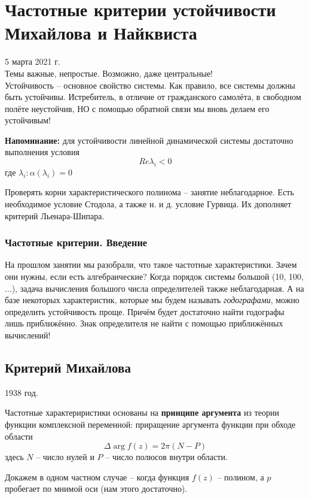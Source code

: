 \documentclass[main.tex]{subfiles}
\begin{document}
\section{ Частотные критерии устойчивости Михайлова и Найквиста }
5 марта 2021 г. \\

Темы важные, непростые.
Возможно, даже центральные! \\

Устойчивость -- основное свойство системы.
Как правило, все системы должны быть устойчивы.
Истребитель, в отличие от гражданского самолёта, в свободном полёте неустойчив, НО с помощью обратной связи мы вновь делаем его устойчивым!

\textbf{Напоминание:} для устойчивости линейной динамической системы достаточно выполнения условия
$$ \boxed{Re \lambda_i < 0} $$
где $ \lambda_i : \alpha(\lambda_i) = 0 $

Проверять корни характеристического полинома -- занятие неблагодарное.
Есть необходимое условие Стодола, а также н. и д. условие Гурвица.
Их дополняет критерий Льенара-Шипара.

\subsubsection{Частотные критерии. Введение}

На прошлом занятии мы разобрали, что такое частотные характеристики.
Зачем они нужны, если есть алгебраические?
Когда порядок системы большой (10, 100, ...), задача вычисления большого числа определителей также неблагодарная.
А на базе некоторых характеристик, которые мы будем называть \emph{годографами}, можно определить устойчивость проще.
Причём будет достаточно найти годографы лишь приближённо.
Знак определителя не найти с помощью приближённых вычислений!

\subsection{Критерий Михайлова}
1938 год.

Частотные характериристики основаны на \textbf{принципе аргумента} из теории функции комплексной переменной: приращение аргумента функции при обходе области
$$ \Delta \arg f(z) = 2 \pi (N - P) $$
здесь $N$ -- число нулей и $ P $ -- число полюсов внутри области.

Докажем в одном частном случае -- когда функция $f(z)$ -- полином, а $p$ пробегает по мнимой оси (нам этого достаточно).
\end{document}
